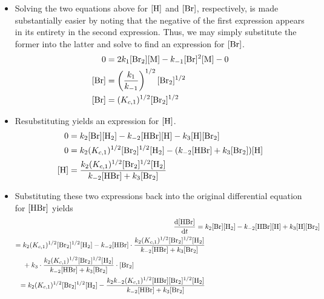 \documentclass[../notes.tex]{subfiles}
\begin{document}
\begin{itemize}
\begin{itemize}
\begin{itemize}
            \item Solving the two equations above for $[\ce{H}]$ and $[\ce{Br}]$, respectively, is made substantially easier by noting that the negative of the first expression appears in its entirety in the second expression. Thus, we may simply substitute the former into the latter and solve to find an expression for $[\ce{Br}]$.
            \begin{align*}
                0 &= 2k_1[\ce{Br2}][\ce{M}]-k_{-1}[\ce{Br}]^2[\ce{M}]-0\\
                [\ce{Br}] &= \left( \frac{k_1}{k_{-1}} \right)^{1/2}[\ce{Br2}]^{1/2}\\
                [\ce{Br}] &= (K_{c,1})^{1/2}[\ce{Br2}]^{1/2}
            \end{align*}
            \item Resubstituting yields an expression for $[\ce{H}]$.
            \begin{align*}
                0 &= k_2[\ce{Br}][\ce{H2}]-k_{-2}[\ce{HBr}][\ce{H}]-k_3[\ce{H}][\ce{Br2}]\\
                0 &= k_2(K_{c,1})^{1/2}[\ce{Br2}]^{1/2}[\ce{H2}]-(k_{-2}[\ce{HBr}]+k_3[\ce{Br2}])[\ce{H}]\\
                [\ce{H}] &= \frac{k_2(K_{c,1})^{1/2}[\ce{Br2}]^{1/2}[\ce{H2}]}{k_{-2}[\ce{HBr}]+k_3[\ce{Br2}]}
            \end{align*}
            \item Substituting these two expressions back into the original differential equation for $[\ce{HBr}]$ yields
            \begin{align*}
                \dv{[\ce{HBr}]}{t} ={}& k_2[\ce{Br}][\ce{H2}]-k_{-2}[\ce{HBr}][\ce{H}]+k_3[\ce{H}][\ce{Br2}]\\
                \begin{split}
                    ={}& k_2(K_{c,1})^{1/2}[\ce{Br2}]^{1/2}[\ce{H2}]-k_{-2}[\ce{HBr}]\cdot\frac{k_2(K_{c,1})^{1/2}[\ce{Br2}]^{1/2}[\ce{H2}]}{k_{-2}[\ce{HBr}]+k_3[\ce{Br2}]}\\
                    &+k_3\cdot\frac{k_2(K_{c,1})^{1/2}[\ce{Br2}]^{1/2}[\ce{H2}]}{k_{-2}[\ce{HBr}]+k_3[\ce{Br2}]}\cdot[\ce{Br2}]
                \end{split}\\
                \begin{split}
                    ={}& k_2(K_{c,1})^{1/2}[\ce{Br2}]^{1/2}[\ce{H2}]-\frac{k_2k_{-2}(K_{c,1})^{1/2}[\ce{HBr}][\ce{Br2}]^{1/2}[\ce{H2}]}{k_{-2}[\ce{HBr}]+k_3[\ce{Br2}]}\\

\end{split}
\end{align*}
\end{itemize}
\end{itemize}
\end{itemize}
\end{document}
